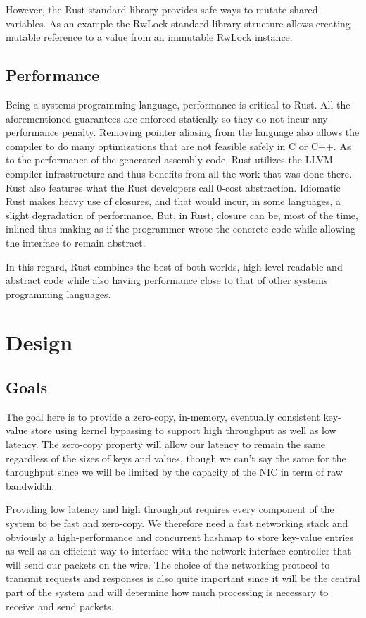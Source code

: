\documentclass[11pt]{book}
\begin{document}
However, the Rust standard library provides safe ways to mutate shared
variables. As an example the RwLock standard library structure allows
creating mutable reference to a value from an immutable RwLock instance.

\section{Performance}

Being a systems programming language, performance is critical to
Rust. All the aforementioned guarantees are enforced statically so
they do not incur any performance penalty. Removing pointer aliasing
from the language also allows the compiler to do many optimizations
that are not feasible safely in C or C++. As to the performance of the
generated assembly code, Rust utilizes the LLVM compiler
infrastructure and thus benefits from all the work that was done
there. Rust also features what the Rust developers call 0-cost
abstraction. Idiomatic Rust makes heavy use of closures, and that
would incur, in some languages, a slight degradation of
performance. But, in Rust, closure can be, most of the time, inlined
thus making as if the programmer wrote the concrete code while
allowing the interface to remain abstract.

In this regard, Rust combines the best of both worlds, high-level
readable and abstract code while also having performance close to that
of other systems programming languages.

\chapter{Design}

\section{Goals} \label{design-goals}

The goal here is to provide a zero-copy, in-memory, eventually
consistent key-value store using kernel bypassing to support high
throughput as well as low latency. The zero-copy property will allow
our latency to remain the same regardless of the sizes of keys and
values, though we can't say the same for the throughput since we will
be limited by the capacity of the NIC in term of raw bandwidth.

Providing low latency and high throughput requires every component of
the system to be fast and zero-copy. We therefore need a fast
networking stack and obviously a high-performance and concurrent
hashmap to store key-value entries as well as an efficient way to
interface with the network interface controller that will send our
packets on the wire. The choice of the networking protocol to transmit
requests and responses is also quite important since it will be the
central part of the system and will determine how much processing is
necessary to receive and send packets.
\end{document}
